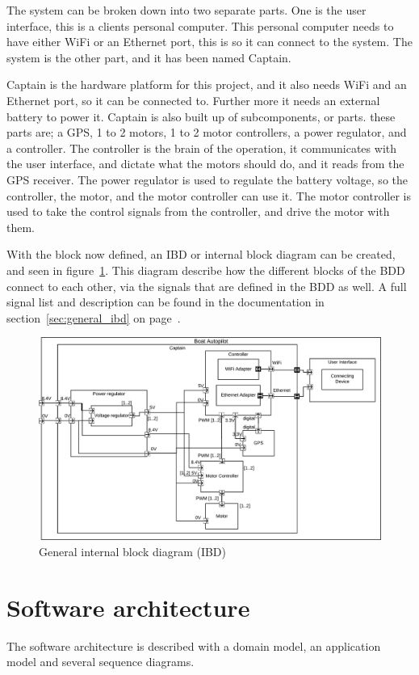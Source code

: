 The system can be broken down into two separate parts. One is the user interface, this is a clients personal computer. This personal computer needs to have either WiFi or an Ethernet port, this is so it can connect to the system. The system is the other part, and it has been named Captain. 

Captain is the hardware platform for this project, and it also needs WiFi and an Ethernet port, so it can be connected to. Further more it needs an external battery to power it.  Captain is also built up of subcomponents, or parts. these parts are; a GPS, 1 to 2 motors, 1 to 2 motor controllers, a power regulator, and a controller. The controller is the brain of the operation, it communicates with the user interface, and dictate what the motors should do, and it reads from the GPS receiver. The power regulator is used to regulate the battery voltage, so the controller, the motor, and the motor controller can use it. The motor controller is used to take the control signals from the controller, and drive the motor with them. 

With the block now defined, an IBD or internal block diagram can be created, and seen in figure~\ref{fig:generalibd}. This diagram describe how the different blocks of the BDD connect to each other, via the signals that are defined in the BDD as well. A full signal list and description can be found in the documentation in section~\ref{sec:general_ibd} on page~\pageref{sec:general_ibd}.
\begin{figure}[H]
\centering
\includegraphics[width=1\linewidth]{../Appendix/Project/Dokumentation/Images/System_architecture/General_IBD}
\caption{General internal block diagram (IBD)}
\label{fig:generalibd}
\end{figure}

\section{Software architecture}
The software architecture is described with a domain model, an application model and several sequence diagrams. 

